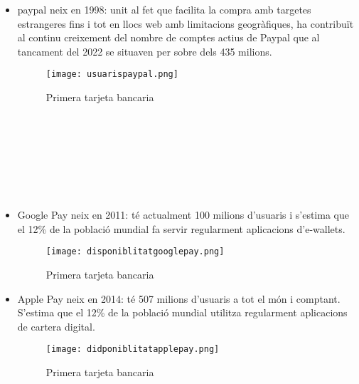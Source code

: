 \begin{itemize}
    \item paypal neix en 1998: unit al fet que facilita la compra amb targetes estrangeres fins i tot en llocs web amb limitacions geogràfiques, ha contribuït al continu creixement del nombre de comptes actius de Paypal que al tancament del 2022 se situaven per sobre dels 435 milions.
    \begin{figure}[h]
        \centering
        \texttt{[image: usuarispaypal.png]}
        \caption{Primera tarjeta bancaria}
    \end{figure}  
    \\
    \\
    \\
    \\
    \\
    \\
    \item Google Pay neix en 2011: té actualment 100 milions d'usuaris i s'estima que el 12\% de la població mundial fa servir regularment aplicacions d'e-wallets. 
    \begin{figure}[h]
        \centering
        \texttt{[image: disponiblitatgooglepay.png]}
        \caption{Primera tarjeta bancaria}
    \end{figure}  
    \item Apple Pay neix en 2014: té 507 milions d'usuaris a tot el món i comptant. S'estima que el 12\% de la població mundial utilitza regularment aplicacions de cartera digital.
    \begin{figure}[h]
        \centering
        \texttt{[image: didponiblitatapplepay.png]}
        \caption{Primera tarjeta bancaria}
    \end{figure}  
\end{itemize}












